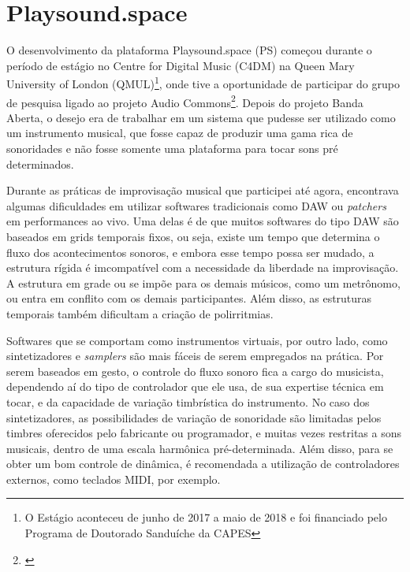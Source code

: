 


\section{Playsound.space}
\label{ch:playsound}


O desenvolvimento da plataforma Playsound.space (PS) começou durante o período de estágio no Centre for Digital Music (C4DM) na Queen Mary University of London (QMUL)\footnote{O Estágio aconteceu de junho de 2017 a maio de 2018 e foi financiado pelo Programa de Doutorado Sanduíche da CAPES}, onde tive a oportunidade de participar do grupo de pesquisa ligado ao projeto Audio Commons\footnote{\cite{Font2016}}. Depois do projeto Banda Aberta, o desejo era de trabalhar em um sistema que pudesse ser utilizado como um instrumento musical, que fosse capaz de produzir uma gama rica de sonoridades e não fosse somente uma plataforma para tocar sons pré determinados. 


Durante as práticas de improvisação musical que participei até agora, encontrava algumas dificuldades em utilizar softwares tradicionais como DAW ou \emph{patchers} em performances ao vivo. Uma delas é de que muitos softwares do tipo DAW são baseados em grids temporais fixos, ou seja, existe um tempo que determina o fluxo dos acontecimentos sonoros, e embora esse tempo possa ser mudado, a estrutura rígida é imcompatível com a necessidade da liberdade na improvisação. A estrutura em grade ou se impõe para os demais músicos, como um metrônomo, ou entra em conflito com os demais participantes. Além disso, as estruturas temporais também dificultam a criação de polirritmias. 


Softwares que se comportam como instrumentos virtuais, por outro lado, como sintetizadores e \emph{samplers} são mais fáceis de serem empregados na prática. Por serem baseados em gesto, o controle do fluxo sonoro fica a cargo do musicista, dependendo aí do tipo de controlador que ele usa, de sua expertise técnica em tocar, e da capacidade de variação timbrística do instrumento. No caso dos sintetizadores, as possibilidades de variação de sonoridade são limitadas pelos timbres oferecidos pelo fabricante ou programador, e muitas vezes restritas a sons musicais, dentro de uma escala harmônica pré-determinada. Além disso, para se obter um bom controle de dinâmica, é recomendada a utilização de controladores externos, como teclados MIDI, por exemplo. 

